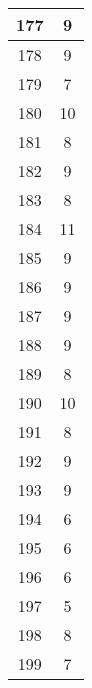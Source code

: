 \documentclass[letterpaper, 12pt]{article}
\begin{document}
\begin{longtable}{|c|c|}
\hline
177 & 9 \\
\hline
178 & 9 \\
\hline
179 & 7 \\
\hline
180 & 10 \\
\hline
181 & 8 \\
\hline
182 & 9 \\
\hline
183 & 8 \\
\hline
184 & 11 \\
\hline
185 & 9 \\
\hline
186 & 9 \\
\hline
187 & 9 \\
\hline
188 & 9 \\
\hline
189 & 8 \\
\hline
190 & 10 \\
\hline
191 & 8 \\
\hline
192 & 9 \\
\hline
193 & 9 \\
\hline
194 & 6 \\
\hline
195 & 6 \\
\hline
196 & 6 \\
\hline
197 & 5 \\
\hline
198 & 8 \\
\hline
199 & 7 \\
\hline
\end{longtable}
\end{document}
